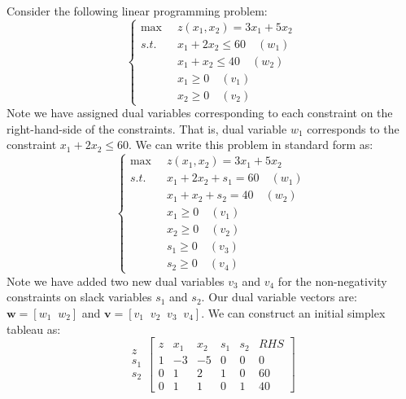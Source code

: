 \begin{example} Consider the following linear programming problem: 
\begin{displaymath}
\left\{
\begin{aligned}
\max\;\;& z(x_1,x_2) = 3x_1 + 5x_2\\
s.t.\;\;&  x_1 + 2x_2 \leq 60 \quad (w_1)\\
& x_1 + x_2 \leq 40 \quad (w_2)\\
& x_1 \geq 0 \quad(v_1)\\
& x_2 \geq 0 \quad(v_2)
\end{aligned}
\right.
\end{displaymath}
Note we have assigned dual variables corresponding to each constraint on the right-hand-side of the constraints. That is, dual variable $w_1$ corresponds to the constraint $x_1 + 2x_2 \leq 60$. We can write this problem in standard form as:
\begin{displaymath}
\left\{
\begin{aligned}
\max\;\;& z(x_1,x_2) = 3x_1 + 5x_2\\
s.t.\;\;&  x_1 + 2x_2 + s_1 = 60 \quad (w_1)\\
& x_1 + x_2 + s_2 = 40 \quad (w_2)\\
& x_1 \geq 0 \quad(v_1)\\
& x_2 \geq 0 \quad(v_2)\\
& s_1 \geq 0 \quad(v_3)\\
& s_2 \geq 0 \quad(v_4)
\end{aligned}
\right.
\end{displaymath}
Note we have added two new dual variables $v_3$ and $v_4$ for the non-negativity constraints on slack variables $s_1$ and $s_2$. Our dual variable vectors are: $\mathbf{w} = [w_1 \;\; w_2]$ and $\mathbf{v} = [v_1\;\;v_2\;\;v_3\;\;v_4]$. We can construct an initial simplex tableau as:
\begin{displaymath}
\begin{array}{c}
z\\s_1\\s_2
\end{array}
\left[\begin{array}{c|cccc|c}
z & 	x_1 &	x_2 & 	s_1 &	s_2 & 	RHS\\
\hline
1 & 	-3 & 	-5 & 	0 & 	0 & 	0\\
\hline
0 &  	1 & 	2 & 	1 & 	0 & 	60\\
0 & 	1 & 	1 & 	0 & 	1 & 	40
\end{array}\right]
\end{displaymath}

\end{example}
